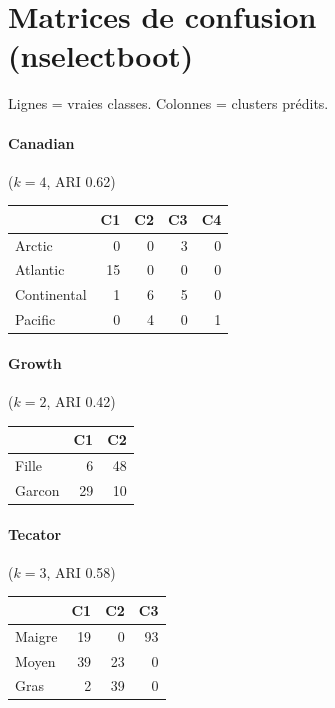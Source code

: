 \documentclass[11pt, a4paper]{article}
\begin{document}
\section{Matrices de confusion (nselectboot)}

Lignes = vraies classes. Colonnes = clusters prédits.

\paragraph{Canadian} ($k=4$, ARI 0.62)
\begin{center}
\small
\begin{tabular}{lrrrr}
\toprule
& C1 & C2 & C3 & C4 \\
\midrule
Arctic & 0 & 0 & 3 & 0 \\
Atlantic & 15 & 0 & 0 & 0 \\
Continental & 1 & 6 & 5 & 0 \\
Pacific & 0 & 4 & 0 & 1 \\
\bottomrule
\end{tabular}
\end{center}

\paragraph{Growth} ($k=2$, ARI 0.42)
\begin{center}
\small
\begin{tabular}{lrr}
\toprule
& C1 & C2 \\
\midrule
Fille & 6 & 48 \\
Garcon & 29 & 10 \\
\bottomrule
\end{tabular}
\end{center}

\paragraph{Tecator} ($k=3$, ARI 0.58)
\begin{center}
\small
\begin{tabular}{lrrr}
\toprule
& C1 & C2 & C3 \\
\midrule
Maigre & 19 & 0 & 93 \\
Moyen & 39 & 23 & 0 \\
Gras & 2 & 39 & 0 \\
\bottomrule
\end{tabular}
\end{center}
\end{document}
